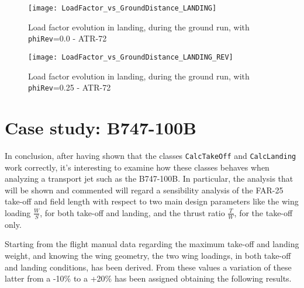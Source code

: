 %
\begin{figure}[!b]
\centering
\texttt{[image: LoadFactor\_vs\_GroundDistance\_LANDING]}
\caption{Load factor evolution in landing, during the ground run, with \lstinline[language=Java]!phiRev!=0.0 - ATR-72}
\end{figure}
%
\begin{figure}[!b]
\centering
\texttt{[image: LoadFactor\_vs\_GroundDistance\_LANDING\_REV]}
\caption{Load factor evolution in landing, during the ground run, with \lstinline[language=Java]!phiRev!=0.25 - ATR-72}
\label{fig:LandingEnd}
\end{figure}
%
%
\clearpage
%
\section{Case study: B747-100B}
%
In conclusion, after having shown that the classes \lstinline[language=Java]!CalcTakeOff! and \lstinline[language=Java]!CalcLanding! work correctly, it's interesting to examine how these classes behaves when analyzing a transport jet such as the B747-100B. In particular, the analysis that will be shown and commented will regard a sensibility analysis of the \gls{FAR}-25 take-off and field length with respect to two main design parameters like the wing loading $\frac{W}{S}$, for both take-off and landing, and the thrust ratio $\frac{T}{W}$, for the take-off only.

\bigskip
\noindent
Starting from the flight manual data regarding the maximum take-off and landing weight, and knowing the wing geometry, the two wing loadings, in both take-off and landing conditions, has been derived. From these values a variation of these latter from a -10\% to a +20\% has been assigned obtaining the following results.  
%


